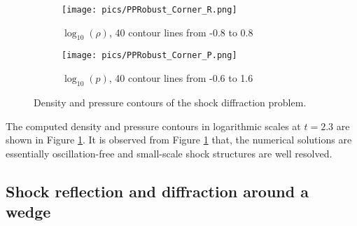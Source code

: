 \begin{figure}[htbp]
    \centering
    \begin{subfigure}{0.5\textwidth}
        \texttt{[image: pics/PPRobust\_Corner\_R.png]}
        \caption[]{$\log_{10}(\rho)$, 40 contour lines from -0.8 to 0.8}
    \end{subfigure}\hfill
    \begin{subfigure}{0.5\textwidth}
        \texttt{[image: pics/PPRobust\_Corner\_P.png]}
        \caption[]{$\log_{10}(p)$, 40 contour lines from -0.6 to 1.6}
    \end{subfigure}
    \caption{Density and pressure contours of the shock diffraction problem.}
    \label{fig:Corner}
\end{figure}

The computed density and pressure contours in logarithmic scales at $t=2.3$ are shown in Figure \ref{fig:Corner}.
It is observed from Figure \ref{fig:Corner} that,
the numerical solutions are essentially oscillation-free and small-scale shock structures are well resolved.


\subsection{Shock reflection and diffraction around a wedge}

